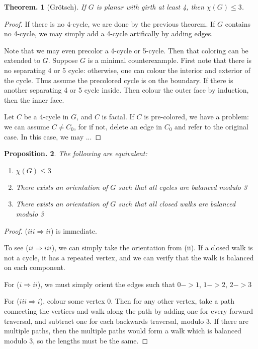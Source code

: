 \documentclass[11pt, a4paper]{memoir}
\newcommand{\imp}[2]{($#1\Rightarrow#2$)\hspace{0.2cm}}
\theoremstyle{change}
\newtheorem{theorem}{Theorem.}[section]
\newtheorem{proposition}[theorem]{Proposition.}
\theoremstyle{plain}
\theoremstyle{nonumberplain}
\newtheorem{proof}{Proof}
\numberwithin{equation}{section}
\begin{document}
\begin{theorem}[Gr\"otsch]
    If $G$ is planar with girth at least 4, then $\chi(G)\leq 3$.
\end{theorem}
\begin{proof}
    If there is no 4-cycle, we are done by the previous theorem.
    If $G$ contains no 4-cycle, we may simply add a 4-cycle artifically by adding edges.

    Note that we may even precolor a 4-cycle or 5-cycle.
    Then that coloring can be extended to $G$.
    Suppose $G$ is a minimal counterexample.
    First note that there is no separating 4 or 5 cycle: otherwise, one can colour the interior and exterior of the cycle.
    Thus assume the precolored cycle is on the boundary.
    If there is another separating 4 or 5 cycle inside.
    Then colour the outer face by induction, then the inner face.

    Let $C$ be a 4-cycle in $G$, and $C$ is facial.
    If $C$ is pre-colored, we have a problem: we can assume $C\neq C_0$, for if not, delete an edge in $C_0$ and refer to the original case.
    In this case, we may ...
\end{proof}
\begin{proposition}
    The following are equivalent:
    \begin{enumerate}[nl,r]
        \item $\chi(G)\leq 3$
        \item There exists an orientation of $G$ such that all cycles are balanced modulo 3
        \item There exists an orientation of $G$ such that all closed walks are balanced modulo 3
    \end{enumerate}
\end{proposition}
\begin{proof}
    \imp{iii}{ii} is immediate.

    To see \imp{ii}{iii}, we can simply take the orientation from (ii).
    If a closed walk is not a cycle, it has a repeated vertex, and we can verify that the walk is balanced on each component.

    For \imp{i}{ii}, we must simply orient the edges such that $0->1$, $1->2$, $2->3$

    For \imp{iii}{i}, colour some vertex 0.
    Then for any other vertex, take a path connecting the vertices and walk along the path by adding one for every forward traversal, and subtract one for each backwards traversal, modulo 3.
    If there are multiple paths, then the multiple paths would form a walk which is balanced modulo 3, so the lengths must be the same.
\end{proof}
\end{document}
